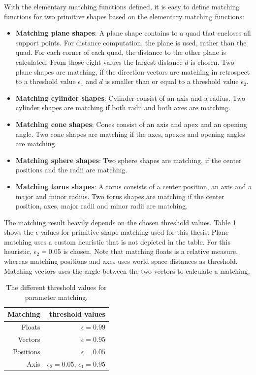 With the elementary matching functions defined, it is easy to define matching functions for two primitive shapes based on the elementary matching functions:

\begin{itemize}
\item \textbf{Matching plane shapes}: 
A plane shape contains to a quad that encloses all support points. For distance computation, the plane is used, rather than the quad. 
For each corner of each quad, the distance to the other plane is calculated. From those eight values the largest distance $d$ is chosen. Two plane shapes are matching, if the direction vectors are matching in retrospect to a threshold value $\epsilon_1$ and $d$ is smaller than or equal to a threshold value $\epsilon_2$.
\item \textbf{Matching cylinder shapes}: 
Cylinder consist of an axis and a radius. Two cylinder shapes are matching if both radii and both axes are matching. 
\item \textbf{Matching cone shapes}:
Cones consist of an axis and apex and an opening angle. Two cone shapes are matching if the axes, apexes and opening angles are matching. 
\item \textbf{Matching sphere shapes}: 
Two sphere shapes are matching, if the center positions and the radii are matching. 
\item \textbf{Matching torus shapes}: 
A torus consists of a center position, an axis and a major and minor radius. Two torus shapes are matching if the center position, axes, major radii and minor radii are matching. 
\end{itemize}

The matching result heavily depends on the chosen threshold values. Table \ref{tab:matchingThresholds} shows the $\epsilon$ values for primitive shape matching used for this thesis. Plane matching uses a custom heuristic that is not depicted in the table. For this heuristic, $\epsilon_2 = 0.05$ is chosen. Note that matching floats is a relative measure, whereas matching positions and axes uses world space distances as threshold. Matching vectors uses the angle between the two vectors to calculate a matching. 

\begin{table}
\centering
\begin{tabular}{ r | r }
	Matching	& threshold values \\
	\hline
  Floats 		& $\epsilon = 0.99$ \\
	Vectors 	& $\epsilon = 0.95$ \\
  Positions & $\epsilon = 0.05$ \\ 
	Axis 			& $\epsilon_2 = 0.05$, $\epsilon_1 = 0.95$ \\  

\end{tabular}
\caption{The different threshold values for parameter matching.}
\label{tab:matchingThresholds}
\end{table}


